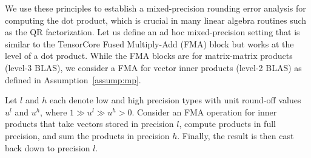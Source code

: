 
We use these principles to establish a mixed-precision rounding error analysis for computing the dot product, which is crucial in many linear algebra routines such as the QR factorization.
Let us define an ad hoc mixed-precision setting that is similar to the TensorCore Fused Multiply-Add (FMA) block but works at the level of a dot product. 
While the FMA blocks are for matrix-matrix products (level-3 BLAS), we consider a FMA for vector inner products (level-2 BLAS) as defined in Assumption~\ref{assump:mp}.
\begin{assump}
	\label{assump:mp}
	Let $l$ and $h$ each denote low and high precision types with unit round-off values $u^l$ and $u^h$, where $1 \gg u^l \gg u^h >0$.
	Consider an FMA operation for inner products that take vectors stored in precision $l$, compute products in full precision, and sum the products in precision $h$. 
	Finally, the result is then cast back down to precision $l$.  
\end{assump}
